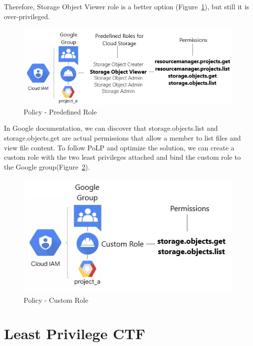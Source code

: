 \documentclass[a4paper,twoside]{article}
\begin{document}
Therefore, Storage Object Viewer role is a better option (Figure~\ref{fig:sto-pre}), but still it is over-privileged. 
\begin{figure}[!h]
  \centering
  \includegraphics[width=\linewidth]{pic/sto-pre}
  \caption {Policy - Predefined Role}
   \label{fig:sto-pre}
\end{figure}
In Google documentation, we can discover that storage.objects.list and storage.objects.get are actual permissions that allow a member to list files and view file content. To follow PoLP and optimize the solution, we can create a custom role with the two least privileges attached and bind the custom role to the Google group(Figure~\ref{fig:sto-cus}).
\begin{figure}[!h]
  \centering
  \includegraphics[width=\linewidth]{pic/sto-cus}
  \caption {Policy - Custom Role}
   \label{fig:sto-cus}
\end{figure}


\section{Least Privilege CTF}
\end{document}
